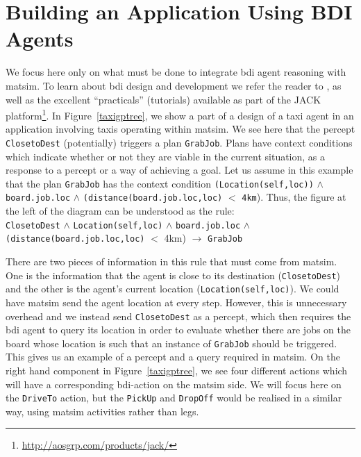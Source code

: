 \section{Building an Application Using BDI Agents}
\label{sec:bdi-usage}
We focus here only on what must be done to integrate  \gls{bdi} agent
reasoning with \gls{matsim}. To learn about \gls{bdi} design and development we
refer the reader to \cite{prometheusbook}, as well as the excellent
``practicals'' (tutorials) available as part of the JACK
platform\footnote{\url{http://aosgrp.com/products/jack/}}. In Figure~\ref{taxigptree}, 
we show a part of a  
design of a taxi agent in an application involving taxis operating
within \gls{matsim}. We see here that the percept \lstinline{ClosetoDest}
(potentially) triggers a plan \lstinline{GrabJob}. Plans have context
conditions which indicate whether or not they are viable in the
current situation, as a response to a percept or a way of achieving a
goal. Let us assume in this example that the plan \lstinline{GrabJob} has
the context condition \lstinline{(Location(self,loc))} $\wedge$ \lstinline{board.job.loc} $\wedge$ \lstinline{(distance(board.job.loc,loc)} $<$
\lstinline{4km}). Thus, the figure at the left of the diagram can be understood as the rule: \\
\lstinline{ClosetoDest} $\wedge$ \lstinline{Location(self,loc)} $\wedge$ \lstinline{board.job.loc} $\wedge$ \lstinline{(distance(board.job.loc,loc)} $<$ 4km) $\rightarrow$ \lstinline{GrabJob} 

There are two pieces of information in this rule that must come from
\gls{matsim}. One is the information that the agent is close to its
destination (\lstinline{ClosetoDest}) and the other is the agent's
current location (\lstinline{Location(self,loc)}).  We could have \gls{matsim}
send the agent location at every step. However, this is unnecessary
overhead and we instead send \lstinline{ClosetoDest} as a percept, which
then requires the \gls{bdi} agent to query its location in order to evaluate
whether there are jobs on the board whose location is such that an
instance of \lstinline{GrabJob} should be triggered.  This gives us an
example of a percept and a query required in \gls{matsim}. On the right hand
component in Figure~\ref{taxigptree}, we see four different actions
which will have a corresponding \gls{bdi}-action on the \gls{matsim} side. We will
focus here on the \lstinline{DriveTo} action, but the \lstinline{PickUp} and
\lstinline{DropOff} would be realised in a similar way, using \gls{matsim}
activities rather than legs.

